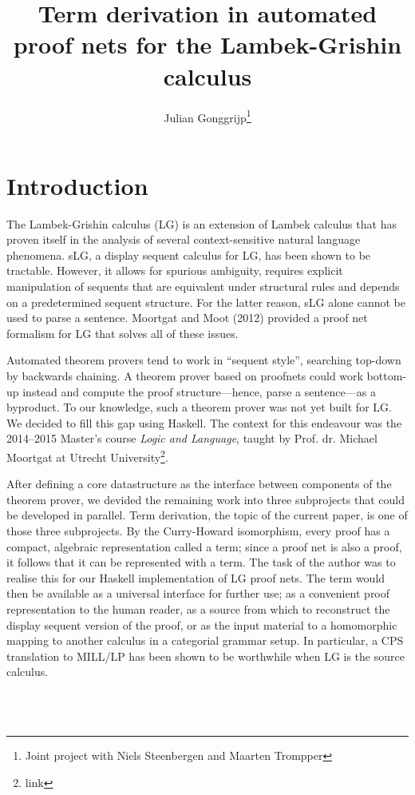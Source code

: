\documentclass{article}
\begin{document}
\title{Term derivation in automated proof nets for the Lambek-Grishin calculus}
\author{Julian Gonggrijp\thanks{Joint project with Niels Steenbergen and Maarten Trompper}}
\date{}
\maketitle

\section{Introduction}

The Lambek-Grishin calculus (LG) is an extension of Lambek calculus that has proven itself in the analysis of several context-sensitive natural language phenomena. sLG, a display sequent calculus for LG, has been shown to be tractable. \cite{m09} However, it allows for spurious ambiguity, requires explicit manipulation of sequents that are equivalent under structural rules and depends on a predetermined sequent structure. For the latter reason, sLG alone cannot be used to parse a sentence. Moortgat and Moot (2012) provided a proof net formalism for LG that solves all of these issues. \cite{mm12}

Automated theorem provers tend to work in ``sequent style'', searching top-down by backwards chaining. A theorem prover based on proofnets could work bottom-up instead and compute the proof structure---hence, parse a sentence---as a byproduct. To our knowledge, such a theorem prover was not yet built for LG. We decided to fill this gap using Haskell. The context for this endeavour was the 2014--2015 Master's course \emph{Logic and Language}, taught by Prof. dr. Michael Moortgat at Utrecht University\footnote{link}.

After defining a core datastructure as the interface between components of the theorem prover, we devided the remaining work into three subprojects that could be developed in parallel. Term derivation, the topic of the current paper, is one of those three subprojects. By the Curry-Howard isomorphism, every proof has a compact, algebraic representation called a term; since a proof net is also a proof, it follows that it can be represented with a term. The task of the author was to realise this for our Haskell implementation of LG proof nets. The term would then be available as a universal interface for further use; as a convenient proof representation to the human reader, as a source from which to reconstruct the display sequent version of the proof, or as the input material to a homomorphic mapping to another calculus in a categorial grammar setup. In particular, a CPS translation to MILL/LP has been shown to be worthwhile when LG is the source calculus. \cite{mm12}

\inputminted{haskell}{../src/LG/Term.hs}

\inputminted{haskell}{../src/LG/Subnet.hs}

\inputminted{haskell}{../src/LG/SubnetGraph.hs}

\inputminted{haskell}{../src/LG/TestGraph.hs}
\end{document}
